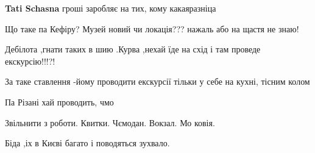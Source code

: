 \begin{itemize}
\begin{itemize}
\textbf{Tati Schasna} гроші заробляє на тих, кому какаяразніца
\end{itemize}

 
Що таке па Кефіру? Музей новий чи локація??? нажаль або на щастя не знаю!

 
Дебілота ,гнати таких в шию .Курва ,нехай їде на схід і там проведе екскурсію!!!?!

 
За таке ставлення -йому проводити екскурсії тільки у себе на кухні, тісним колом

 
Па Різані хай проводить, чмо

 
Звільнити з роботи. Квитки. Чємодан. Вокзал. Мо ковія.

 
Біда ,іх в Києві багато і поводяться зухвало.

 

\end{itemize}
